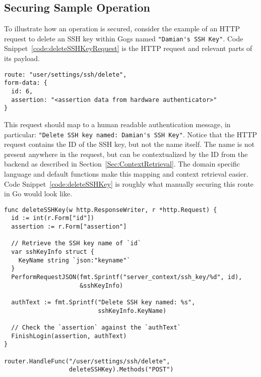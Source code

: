 \subsection{Securing Sample Operation}

To illustrate how an operation is secured, consider the example of an HTTP request to delete an SSH key within Gogs named \lstinline{"Damian's SSH Key"}. Code Snippet~\ref{code:deleteSSHKeyRequest} is the HTTP request and relevant parts of its payload.

\begin{lstlisting}[float=h,label=code:deleteSSHKeyRequest,caption=A sample HTTP request to delete the SSH key with ID 6.] 
route: "user/settings/ssh/delete",
form-data: {
  id: 6,
  assertion: "<assertion data from hardware authenticator>"
}
\end{lstlisting}

This request should map to a human readable authentication message, in particular: \lstinline{"Delete SSH key named: Damian's SSH Key"}. Notice that the HTTP request contains the ID of the SSH key, but not the name itself. The name is not present anywhere in the request, but can be contextualized by the ID from the backend as described in Section~\ref{Sec:ContextRetrieval}. The domain specific language and default functions make this mapping and context retrieval easier. Code Snippet~\ref{code:deleteSSHKey} is roughly what manually securing this route in Go would look like.

\begin{lstlisting}[float=h,label=code:deleteSSHKey,caption=Route handler which manually secures the delete SSH key operation of Gogs.] 
func deleteSSHKey(w http.ResponseWriter, r *http.Request) {
  id := int(r.Form["id"])
  assertion := r.Form["assertion"]

  // Retrieve the SSH key name of `id`
  var sshKeyInfo struct {
    KeyName string `json:"keyname"`
  }
  PerformRequestJSON(fmt.Sprintf("server_context/ssh_key/%d", id),
                     &sshKeyInfo)

  authText := fmt.Sprintf("Delete SSH key named: %s", 
                          sshKeyInfo.KeyName)

  // Check the `assertion` against the `authText`
  FinishLogin(assertion, authText)
}

router.HandleFunc("/user/settings/ssh/delete", 
                  deleteSSHKey).Methods("POST")
\end{lstlisting}


